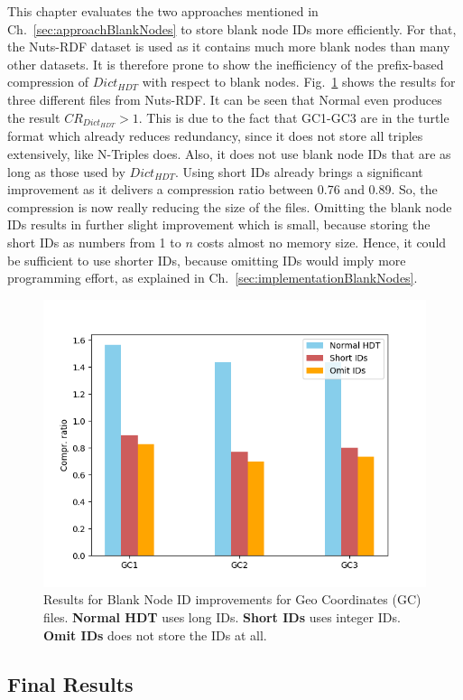 This chapter evaluates the two approaches mentioned in Ch.~\ref{sec:approachBlankNodes} to store blank node IDs more efficiently. For that, the Nuts-RDF dataset is used as it contains much more blank nodes than many other datasets. It is therefore prone to show the inefficiency of the prefix-based compression of $Dict_{HDT}$ with respect to blank nodes. Fig.~\ref{fig:blanknodes} shows the results for three different files from Nuts-RDF. It can be seen that Normal \DHDT{} even produces the result $CR_{Dict_{HDT}}>1$. This is due to the fact that GC1-GC3 are in the turtle format which already reduces redundancy, since it does not store all triples extensively, like N-Triples does. Also, it does not use blank node IDs that are as long as those used by $Dict_{HDT}$. Using short IDs already brings a significant improvement as it delivers a compression ratio between 0.76 and 0.89. So, the compression is now really reducing the size of the files. Omitting the blank node IDs results in further slight improvement which is small, because storing the short IDs as numbers from 1 to $n$ costs almost no memory size. Hence, it could be sufficient to use shorter IDs, because omitting IDs would imply more programming effort, as explained in Ch.~\ref{sec:implementationBlankNodes}.


\begin{figure}
	\centering
	\includegraphics[width=0.8\linewidth]{figures/4_evaluation/blankNodes}
	\caption{Results for Blank Node ID improvements for Geo Coordinates (GC) files. \textbf{Normal HDT} uses long IDs. \textbf{Short IDs} uses integer IDs. \textbf{Omit IDs} does not store the IDs at all.}
	\label{fig:blanknodes}
\end{figure}


\subsection{Final Results}\label{sec:evaluationFinal}

